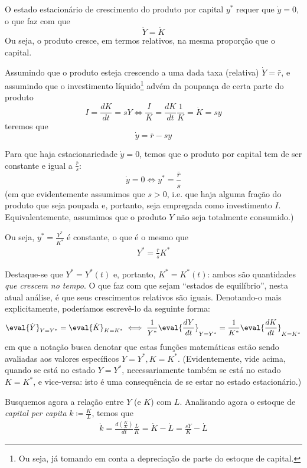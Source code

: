 O estado estacionário de crescimento do produto por capital $y^{*}$ requer que $\dot{y}=0$, o que faz com que
$$
\dot{Y} = \dot{K}
$$
Ou seja, o produto cresce, em termos relativos, na mesma proporção que o capital. 

Assumindo que o produto esteja crescendo a uma dada taxa (relativa) $\dot{Y} = \bar{r}$, e assumindo que o investimento líquido\footnote{Ou seja, já tomando em conta a depreciação de parte do estoque de capital.} advém da poupança de certa parte do produto
$$
I=\frac{dK}{dt} = sY \iff \frac{I}{K} = \frac{dK}{dt} \frac{1}{K} = \dot{K} = s y
$$
teremos que
$$
\dot{y} = \bar{r} - sy
$$

Para que haja estacionariedade $\dot{y}=0$, temos que o produto por capital tem de ser constante e igual a $\frac{\bar{r}}{s}$:
$$
\dot{y} = 0 \iff  y^{*} = \frac{\bar{r}}{s}
$$
(em que evidentemente assumimos que $s > 0$, i.e. que haja alguma fração do produto que seja poupada e, portanto, seja empregada como investimento $I$. Equivalentemente, assumimos que o produto $Y$ não seja totalmente consumido.)

Ou seja, $y^{*}=\frac{Y^{*}}{K^{*}}$ é constante, o que é o mesmo que
\begin{align}
    \label{equacao_ystar}
    Y^{*} = \frac{\bar{r}}{s} K^{*}
\end{align}


Destaque-se que $Y^* = Y^*(t)$ e, portanto, $K^* = K^*(t)$: ambos são quantidades \textit{que crescem no tempo}. O que faz com que sejam ``estados de equilíbrio'', nesta atual análise, é que seus crescimentos relativos são iguais. Denotando-o mais explicitamente, poderíamos escrevê-lo da seguinte forma:
$$
\eval{\dot{Y}}_{Y=Y^*} = \eval{\dot{K}}_{K=K^*} \iff \frac{1}{Y^*} \eval{\frac{dY}{dt}}_{Y=Y^*} = \frac{1}{K^*} \eval{\frac{dK}{dt}}_{K=K^*}
$$
em que a notação busca denotar que estas funções matemáticas estão sendo avaliadas aos valores específicos $Y=Y^*, K=K^*$. (Evidentemente, vide acima, quando se está no estado $Y=Y^*$, necessariamente também se está no estado $K=K^*$, e vice-versa: isto é uma consequência de se estar no estado estacionário.)

Busquemos agora a relação entre $Y$ (e $K$) com $L$. Analisando agora o estoque de \textit{capital per capita} $k \coloneqq \frac{K}{L}$, temos que
\begin{align*}
\dot{k} = \frac{d\left( \frac{K}{L} \right)}{dt} \frac{L}{K} = \dot{K} - \dot{L} = \frac{sY}{K} - \dot{L}
\end{align*}

